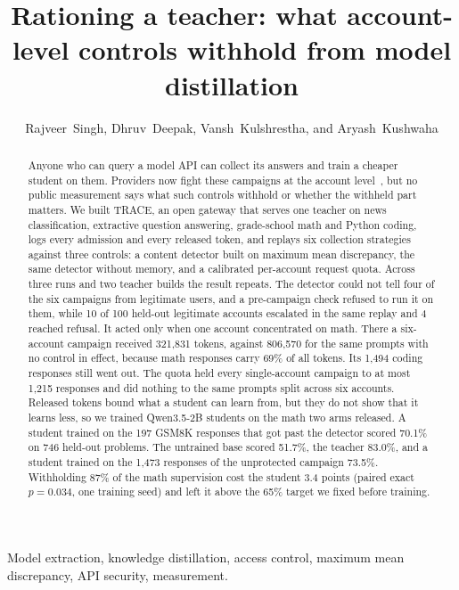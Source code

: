 \documentclass[journal]{IEEEtran}
\title{Rationing a teacher: what account-level controls withhold from model distillation}
\author{Rajveer~Singh, Dhruv~Deepak, Vansh~Kulshrestha, and Aryash~Kushwaha}
\begin{document}
\maketitle

\begin{abstract}
Anyone who can query a model API can collect its answers and train a cheaper student on them. Providers now fight these campaigns at the account level~\cite{anthropic2026detecting,openai2026disrupting}, but no public measurement says what such controls withhold or whether the withheld part matters. We built TRACE, an open gateway that serves one teacher on news classification, extractive question answering, grade-school math and Python coding, logs every admission and every released token, and replays six collection strategies against three controls: a content detector built on maximum mean discrepancy, the same detector without memory, and a calibrated per-account request quota. Across three runs and two teacher builds the result repeats. The detector could not tell four of the six campaigns from legitimate users, and a pre-campaign check refused to run it on them, while 10 of 100 held-out legitimate accounts escalated in the same replay and 4 reached refusal. It acted only when one account concentrated on math. There a six-account campaign received 321,831 tokens, against 806,570 for the same prompts with no control in effect, because math responses carry 69\% of all tokens. Its 1,494 coding responses still went out. The quota held every single-account campaign to at most 1,215 responses and did nothing to the same prompts split across six accounts. Released tokens bound what a student can learn from, but they do not show that it learns less, so we trained Qwen3.5-2B students on the math two arms released. A student trained on the 197 GSM8K responses that got past the detector scored 70.1\% on 746 held-out problems. The untrained base scored 51.7\%, the teacher 83.0\%, and a student trained on the 1,473 responses of the unprotected campaign 73.5\%. Withholding 87\% of the math supervision cost the student 3.4 points (paired exact $p=0.034$, one training seed) and left it above the 65\% target we fixed before training.
\end{abstract}
\begin{IEEEkeywords}
Model extraction, knowledge distillation, access control, maximum mean discrepancy, API security, measurement.
\end{IEEEkeywords}
\end{document}

